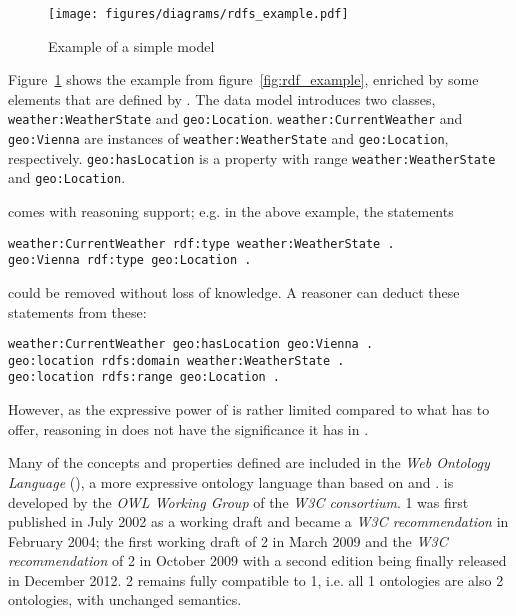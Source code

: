 \begin{figure}
\centering
\texttt{[image: figures/diagrams/rdfs\_example.pdf]}
\caption{Example of a simple  model}
\label{fig:rdfs_example}
\end{figure}

Figure~\ref{fig:rdfs_example} shows the example from figure~\ref{fig:rdf_example}, enriched by some elements that are defined by . The data model introduces two classes, \texttt{weather:WeatherState} and \texttt{geo:Location}. \texttt{weather:CurrentWeather} and \texttt{geo:Vienna} are instances of \texttt{weather:WeatherState} and \texttt{geo:Location}, respectively. \texttt{geo:hasLocation} is a property with range \texttt{weather:WeatherState} and \texttt{geo:Location}.

 comes with reasoning support; e.g. in the above example, the statements

\begin{verbatim}
weather:CurrentWeather rdf:type weather:WeatherState .
geo:Vienna rdf:type geo:Location .
\end{verbatim}

could be removed without loss of knowledge. A reasoner can deduct these statements from these:

\begin{verbatim}
weather:CurrentWeather geo:hasLocation geo:Vienna .
geo:location rdfs:domain weather:WeatherState .
geo:location rdfs:range geo:Location .
\end{verbatim}
However, as the expressive power of  is rather limited compared to what  has to offer, reasoning in  does not have the significance it has in .


Many of the concepts and properties defined are included in the \emph{Web Ontology Language} (), a more expressive ontology language than  based on  and .  is developed by the \emph{OWL Working Group} of the \emph{W3C consortium}.  1 was first published in July 2002 as a working draft and became a \emph{W3C recommendation} in February 2004; the first working draft of  2 in March 2009 and the \emph{W3C recommendation} of  2 in October 2009 with a second edition being finally released in December 2012.  2 remains fully compatible to  1, i.e. all  1 ontologies are also  2 ontologies, with unchanged semantics.

